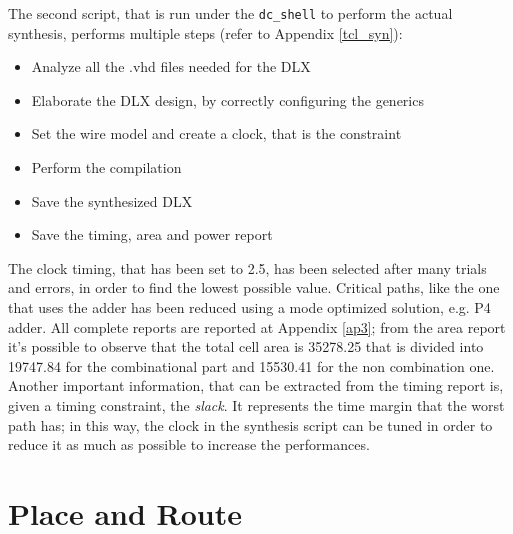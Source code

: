 The second script, that is run under the \texttt{dc\_shell} to perform the actual synthesis, performs multiple steps (refer to Appendix \ref{tcl_syn}):
\begin{itemize}
	\itemsep0sp
	\item Analyze all the .vhd files needed for the DLX
	\item Elaborate the DLX design, by correctly configuring the generics
	\item Set the wire model and create a clock, that is the constraint
	\item Perform the compilation
	\item Save the synthesized DLX
	\item Save the timing, area and power report 
\end{itemize}
The clock timing, that has been set to 2.5, has been selected after many trials and errors, in order to find the lowest possible value. Critical paths, like the one that uses the adder has been reduced using a mode optimized solution, e.g. P4 adder.\newline\newline
All complete reports are reported at Appendix \ref{ap3}; from the area report it's possible to observe that the total cell area is 35278.25 that is divided into 19747.84 for the combinational part and 15530.41 for the non combination one.\newline\newline
Another important information, that can be extracted from the timing report is, given a timing constraint, the \textit{slack}. It represents the time margin that the worst path has; in this way, the clock in the synthesis script can be tuned in order to reduce it as much as possible to increase the performances.



\section{Place and Route}